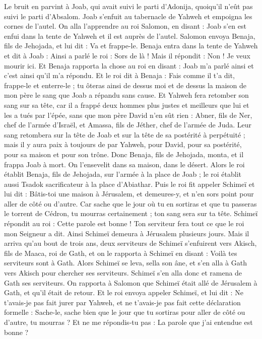 \begin{multicols}{2}
Le bruit en parvint à Joab, qui avait suivi le parti d’Adonija, quoiqu'il n’eût pas suivi le parti d’Absalom. Joab s'enfuit au tabernacle de Yahweh et empoigna les cornes de l'autel.
On alla l’apprendre au roi Salomon, en disant : Joab s'en est enfui dans la tente de Yahweh et il est auprès de l'autel. Salomon envoya Benaja, fils de Jehojada, et lui dit : Va et frappe-le.
Benaja entra dans la tente de Yahweh et dit à Joab : Ainsi a parlé le roi : Sors de là ! Mais il répondit : Non ! Je veux mourir ici. Et Benaja rapporta la chose au roi en disant : Joab m'a parlé ainsi et c’est ainsi qu’il m’a répondu.
Et le roi dit à Benaja : Fais comme il t'a dit, frappe-le et enterre-le ; tu ôteras ainsi de dessus moi et de dessus la maison de mon père le sang que Joab a répandu sans cause.
Et Yahweh fera retomber son sang sur sa tête, car il a frappé deux hommes plus justes et meilleurs que lui et les a tués par l'épée, sans que mon père David n’en sût rien : Abner, fils de Ner, chef de l'armée d'Israël, et Amassa, fils de Jéther, chef de l'armée de Juda.
Leur sang retombera sur la tête de Joab et sur la tête de sa postérité à perpétuité ; mais il y aura paix à toujours de par Yahweh, pour David, pour sa postérité, pour sa maison et pour son trône.
Donc Benaja, fils de Jehojada, monta, et il frappa Joab à mort. On l'ensevelit dans sa maison, dans le désert.
Alors le roi établit Benaja, fils de Jehojada, sur l'armée à la place de Joab ; le roi établit aussi Tsadok sacrificateur à la place d'Abiathar.
Puis le roi fit appeler Schimeï et lui dit : Bâtis-toi une maison à Jérusalem, et demeures-y, et n'en sors point pour aller de côté ou d'autre.
Car sache que le jour où tu en sortiras et que tu passeras le torrent de Cédron, tu mourras certainement ; ton sang sera sur ta tête.
Schimeï répondit au roi : Cette parole est bonne ! Ton serviteur fera tout ce que le roi mon Seigneur a dit. Ainsi Schimeï demeura à Jérusalem plusieurs jours.
Mais il arriva qu'au bout de trois ans, deux serviteurs de Schimeï s'enfuirent vers Akisch, fils de Maaca, roi de Gath, et on le rapporta à Schimeï en disant : Voilà tes serviteurs sont à Gath.
Alors Schimeï se leva, sella son âne, et s'en alla à Gath vers Akisch pour chercher ses serviteurs. Schimeï s'en alla donc et ramena de Gath ses serviteurs.
On rapporta à Salomon que Schimeï était allé de Jérusalem à Gath, et qu'il était de retour.
Et le roi envoya appeler Schimeï, et lui dit : Ne t'avais-je pas fait jurer par Yahweh, et ne t'avais-je pas fait cette déclaration formelle : Sache-le, sache bien que le jour que tu sortiras pour aller de côté ou d’autre, tu mourras ? Et ne me répondis-tu pas : La parole que j'ai entendue est bonne ?

\end{multicols}
